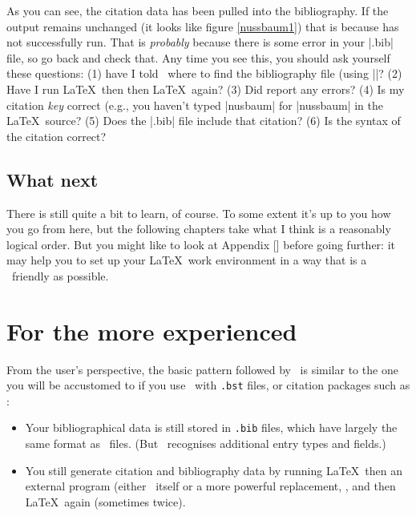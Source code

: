 As you can see, the citation data has been pulled into the bibliography. If the output remains unchanged (it looks like figure \ref{nussbaum1}) that is because  has not successfully run. That is \emph{probably} because there is some error in your |.bib| file, so go back and check that. Any time you see this, you should ask yourself these questions: (1) have I told \biblatex\ where to find the bibliography file (using ||? (2) Have I run \LaTeX\ then  then \LaTeX\ again? (3) Did  report any errors? (4) Is my citation \emph{key} correct (e.g., you haven't typed |nusbaum| for |nussbaum| in the \LaTeX\ source? (5) Does the |.bib| file include that citation? (6) Is the syntax of the citation correct?
\subsection{What next}

There is still quite a bit to learn, of course. To some extent it's up to you how you go from here, but the following chapters take what I think is a reasonably logical order. But you might like to look at Appendix [] before going further: it may help you to set up your \LaTeX\ work environment in a way that is a \biblatex\ friendly as possible.

\section{For the more experienced}

From the user's perspective, the basic pattern followed by \biblatex\ is similar to the one you will be accustomed to if you use \bibtex\ with \verb|.bst| files, or citation packages such as :
\begin{itemize}
\item Your bibliographical data is still stored in \verb|.bib| files, which have largely the same format as \bibtex\ files. (But \biblatex\ recognises additional entry types and fields.)
\item You still generate citation and bibliography data by running \LaTeX\, then an external program (either \bibtex\ itself or a more powerful replacement, , and then \LaTeX\ again (sometimes twice).
\end{itemize}

